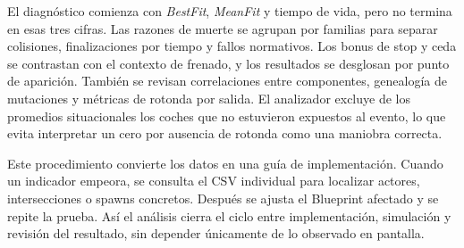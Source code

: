 El diagnóstico comienza con \textit{BestFit}, \textit{MeanFit} y tiempo de vida, pero no termina en esas tres cifras. Las razones de muerte se agrupan por familias para separar colisiones, finalizaciones por tiempo y fallos normativos. Los bonus de stop y ceda se contrastan con el contexto de frenado, y los resultados se desglosan por punto de aparición. También se revisan correlaciones entre componentes, genealogía de mutaciones y métricas de rotonda por salida. El analizador excluye de los promedios situacionales los coches que no estuvieron expuestos al evento, lo que evita interpretar un cero por ausencia de rotonda como una maniobra correcta.

Este procedimiento convierte los datos en una guía de implementación. Cuando un indicador empeora, se consulta el CSV individual para localizar actores, intersecciones o spawns concretos. Después se ajusta el Blueprint afectado y se repite la prueba. Así el análisis cierra el ciclo entre implementación, simulación y revisión del resultado, sin depender únicamente de lo observado en pantalla.
